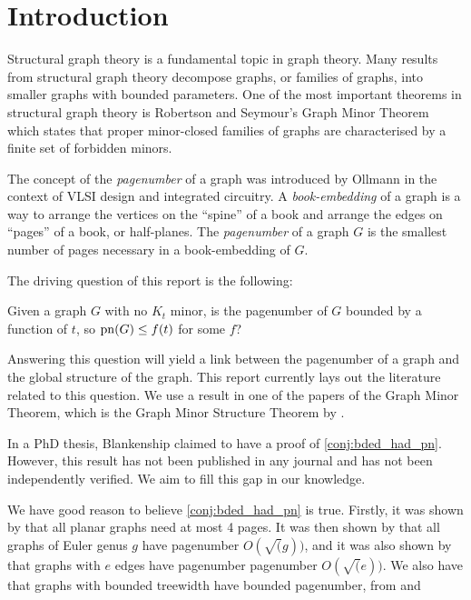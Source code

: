 \chapter{Introduction}\label{sec:introduction}
Structural graph theory is a fundamental topic in graph theory. Many results from structural graph theory decompose graphs, or families of graphs, into smaller graphs with bounded parameters. One of the most important theorems in structural graph theory is Robertson and Seymour's Graph Minor Theorem \cite{robertsonGraphMinorsXX2004} which states that proper minor-closed families of graphs are characterised by a finite set of forbidden minors.
\par
The concept of the \textit{pagenumber} of a graph was introduced by Ollmann \cite{ollmannBookThicknessVarious1973} in the context of VLSI design and integrated circuitry. A \textit{book-embedding} of a graph is a way to arrange the vertices on the ``spine'' of a book and arrange the edges on ``pages'' of a book, or half-planes. The \textit{pagenumber} of a graph \(G\) is the smallest number of pages necessary in a book-embedding of \(G\).

The driving question of this report is the following:
\begin{conjecture}\label{conj:bded_had_pn}
	Given a graph \(G\) with no \(K_t\) minor, is the pagenumber of \(G\) bounded by a function of \(t\), so \(\operatorname{pn}(G) \leq f(t)\) for some \(f\)?
\end{conjecture}
Answering this question will yield a link between the pagenumber of a graph and the global structure of the graph. This report currently lays out the literature related to this question. We use a result in one of the papers of the Graph Minor Theorem, which is the Graph Minor Structure Theorem by \textcite{robertsonGraphMinorsXVI2003}.

In a PhD thesis, Blankenship claimed to have a proof of \cref{conj:bded_had_pn}.\cite{Blankenship-PhD03} However, this result has not been published in any journal and has not been independently verified. We aim to fill this gap in our knowledge.

We have good reason to believe \cref{conj:bded_had_pn} is true. Firstly, it was shown by \textcite{yannakakisEmbeddingPlanarGraphs1989} that all planar graphs need at most 4 pages. It was then shown by \textcite{malitzGenusGraphsHave1994} that all graphs of Euler genus $g$ have pagenumber $O(\sqrt(g))$, and it was also shown by \textcite{malitzGraphsEdgesHave1994} that graphs with $e$ edges have pagenumber pagenumber $O(\sqrt(e))$. We also have that graphs with bounded treewidth have bounded pagenumber, from \textcite{ganleyPagenumberTrees2001} and \textcite{dujmovicGraphTreewidthGeometric2007}
